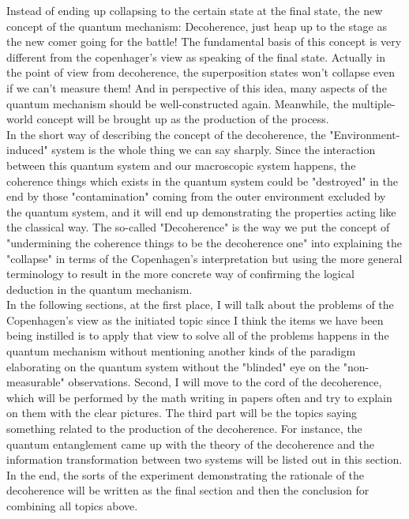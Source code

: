 \documentclass[final,1p,12pt]{elsarticle}
\begin{document}
Instead of ending up collapsing to the certain state at the final state, the new concept of the quantum mechanism: Decoherence, just heap up to the stage as the new comer going for the battle! The fundamental basis of this concept is very different from the copenhager's view as speaking of the final state. Actually in the point of view from decoherence, the superposition states won't collapse even if we can't measure them! And in perspective of this idea, many aspects of the quantum mechanism should be well-constructed again. Meanwhile, the multiple-world concept will be brought up as the production of the process.\\ 

In the short way of describing the concept of the decoherence, the "Environment-induced" system is the whole thing we can say sharply. Since the interaction between this quantum system and our macroscopic system happens, the coherence things which exists in the quantum system could be "destroyed" in the end by those "contamination" coming from the outer environment excluded by the quantum system, and it will end up demonstrating the properties acting like the classical way. The so-called "Decoherence" is the way we put the concept of "undermining the coherence things to be the decoherence one" into explaining the "collapse" in terms of the Copenhagen's interpretation but using the more general terminology to result in the more concrete way of confirming the logical deduction in the quantum mechanism.\\ 

In the following sections, at the first place, I will talk about the problems of the Copenhagen's view as the initiated topic since I think the items we have been being instilled is to apply that view to solve all of the problems happens in the quantum mechanism without mentioning another kinds of the paradigm elaborating on the quantum system without the "blinded" eye on the "non-measurable" observations. Second, I will move to the cord of the decoherence, which will be performed by the math writing in papers often and try to explain on them with the clear pictures. The third part will be the topics saying something related to the production of the decoherence. For instance, the quantum entanglement came up with the theory of the decoherence and the information transformation between two systems will be listed out in this section. In the end, the sorts of the experiment demonstrating the rationale of the decoherence will be written as the final section and then the conclusion for combining all topics above.\\
\end{document}

